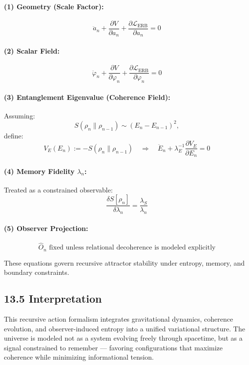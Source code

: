 \paragraph{(1) Geometry (Scale Factor):}
\[
\ddot{a}_n + \frac{\partial V}{\partial a_n} + \frac{\partial \mathcal{L}_{\text{ERB}}}{\partial a_n} = 0
\]

\paragraph{(2) Scalar Field:}
\[
\ddot{\varphi}_n + \frac{\partial V}{\partial \varphi_n} + \frac{\partial \mathcal{L}_{\text{ERB}}}{\partial \varphi_n} = 0
\]

\paragraph{(3) Entanglement Eigenvalue (Coherence Field):}
Assuming:
\[
S(\rho_n \| \rho_{n-1}) \sim (E_n - E_{n-1})^2,
\]
define:
\[
V_E(E_n) := -S(\rho_n \| \rho_{n-1})
\quad \Rightarrow \quad
\ddot{E}_n + \lambda_E^{-1} \frac{\partial V_E}{\partial E_n} = 0
\]

\paragraph{(4) Memory Fidelity \( \lambda_n \):}
Treated as a constrained observable:
\[
\frac{\delta S[\rho_n]}{\delta \lambda_n} = \frac{\lambda_S}{\lambda_n}
\]

\paragraph{(5) Observer Projection:}
\[
\hat{O}_n \text{ fixed unless relational decoherence is modeled explicitly}
\]

These equations govern recursive attractor stability under entropy, memory, and boundary constraints.

\subsection{13.5 Interpretation}

This recursive action formalism integrates gravitational dynamics, coherence evolution, and observer-induced entropy into a unified variational structure. The universe is modeled not as a system evolving freely through spacetime, but as a signal constrained to remember — favoring configurations that maximize coherence while minimizing informational tension.

